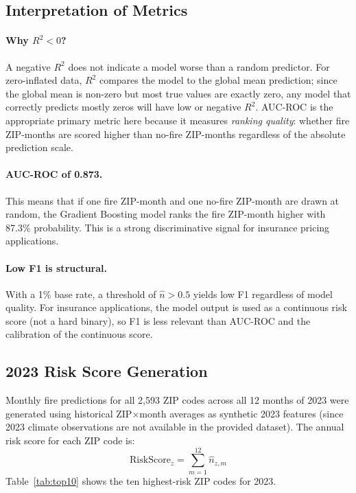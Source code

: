 \documentclass[11pt,a4paper]{article}
\begin{document}
\subsection{Interpretation of Metrics}

\paragraph{Why $R^2 < 0$?}
A negative $R^2$ does not indicate a model worse than a random predictor.
For zero-inflated data, $R^2$ compares the model to the global mean
prediction; since the global mean is non-zero but most true values are
exactly zero, any model that correctly predicts mostly zeros will have
low or negative $R^2$. AUC-ROC is the appropriate primary metric here
because it measures \emph{ranking quality}: whether fire ZIP-months
are scored higher than no-fire ZIP-months regardless of the absolute
prediction scale.

\paragraph{AUC-ROC of 0.873.}
This means that if one fire ZIP-month and one no-fire ZIP-month are drawn
at random, the Gradient Boosting model ranks the fire ZIP-month higher
with 87.3\% probability. This is a strong discriminative signal for
insurance pricing applications.

\paragraph{Low F1 is structural.}
With a 1\% base rate, a threshold of $\hat{n} > 0.5$ yields low F1 regardless
of model quality. For insurance applications, the model output is used as
a continuous risk score (not a hard binary), so F1 is less relevant than
AUC-ROC and the calibration of the continuous score.

\subsection{2023 Risk Score Generation}

Monthly fire predictions for all 2,593 ZIP codes across all 12 months of
2023 were generated using historical ZIP$\times$month averages as synthetic
2023 features (since 2023 climate observations are not available in the
provided dataset). The annual risk score for each ZIP code is:
\begin{equation}
    \text{RiskScore}_{z} = \sum_{m=1}^{12} \hat{n}_{z,m}
    \label{eq:risk}
\end{equation}
Table~\ref{tab:top10} shows the ten highest-risk ZIP codes for 2023.
\end{document}
